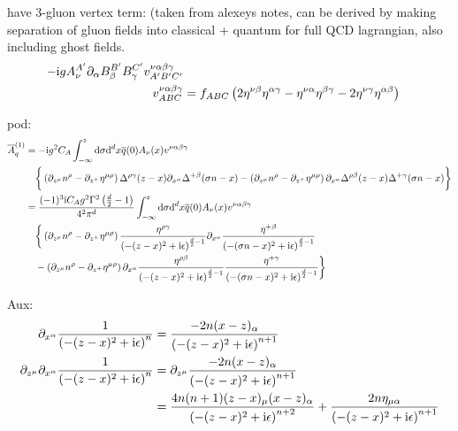 have 3-gluon vertex term: (taken from alexeys notes, can be derived by making separation of gluon fields into classical + quantum for full QCD lagrangian, also including ghost fields. 
\begin{align}
	-\text{i} g A_\nu^{A'} \partial_\alpha B_\beta^{B'} B_\gamma^{C'} v^{\nu\alpha\beta\gamma}_{A'B'C'}
	\\
	v^{\nu\alpha\beta\gamma}_{ABC}
	&=f_{ABC}\left(2\eta^{\nu \beta}\eta^{\alpha\gamma} - \eta^{\nu \alpha}\eta^{\beta\gamma} -2\eta^{\nu\gamma}\eta^{\alpha\beta}\right)
\end{align}


pod: 
\begin{align}
	\overline A_q^{(1)}
	&=
	-\text{i} g^2 C_A \int_{-\infty}^z \text{d} \sigma \text{d} ^d x  \overline q(0) A_\nu (x) v^{\nu\alpha\beta\gamma}
	\\&~~~
	\bigg\{ \left( \partial_{z^\mu} n^\rho - \partial_{z^+} \eta^{\mu \rho} \right) \Delta^{\rho \gamma} (z-x) \partial_{x^\alpha} \Delta^{+ \beta}(\sigma n -x) - \left(\partial_{z^\mu} n^\rho - \partial_{z^+} \eta ^{\mu \rho} \right) \partial_{x^\alpha} \Delta^{\rho \beta} (z-x) \Delta^{+\gamma} (\sigma n -x) \bigg\}
	\\
	&=
	\frac{(-1)^3 \text{i} C_A g^2 \Gamma^2\left( \frac{d}{2} -1\right)}{4^2\pi^{d}} \int_{-\infty}^z \text{d} \sigma \text{d} ^d x  \overline q(0) A_\nu (x) v^{\nu\alpha\beta\gamma}
	\\&~~~
	\bigg\{ \left( \partial_{z^\mu} n^\rho - \partial_{z^+} \eta^{\mu \rho} \right) \frac{\eta^{\rho \gamma}}{ \left(-(z-x)^2+\text{i}\epsilon\right)^{\frac{d}{2}-1}} \partial_{x^\alpha} \frac{\eta^{+\beta}}{ \left(-(\sigma n -x)^2+\text{i}\epsilon\right)^{\frac{d}{2}-1}} 
	\\&~~~
	- \left(\partial_{z^\mu} n^\rho - \partial_{z^+} \eta ^{\mu \rho} \right) \partial_{x^\alpha} \frac{\eta^{\rho \beta}}{ \left(-(z-x)^2+\text{i}\epsilon\right)^{\frac{d}{2}-1}} \frac{\eta^{+ \gamma}}{ \left(-(\sigma n -x)^2+\text{i}\epsilon\right)^{\frac{d}{2}-1}} \bigg\}
\end{align}

Aux:
\begin{align}
	\partial_{x^\alpha} \frac{1}{ \left(-(z-x)^2+\text{i}\epsilon\right)^{n}}
	&=
	\frac{-2n(x-z)_\alpha}{ \left(-(z-x)^2+\text{i}\epsilon\right)^{n+1}}
	\\
	\partial_{z^\mu}\partial_{x^\alpha} \frac{1}{ \left(-(z-x)^2+\text{i}\epsilon\right)^{n}}
	&=
	\partial_{z^\mu}\frac{-2n(x-z)_\alpha}{ \left(-(z-x)^2+\text{i}\epsilon\right)^{n+1}}
	\\
	&=
	\frac{4n(n+1)(z-x)_\mu(x-z)_\alpha}{ \left(-(z-x)^2+\text{i}\epsilon\right)^{n+2}} + 
	\frac{2n\eta_{\mu\alpha}}{ \left(-(z-x)^2+\text{i}\epsilon\right)^{n+1}}
\end{align}

